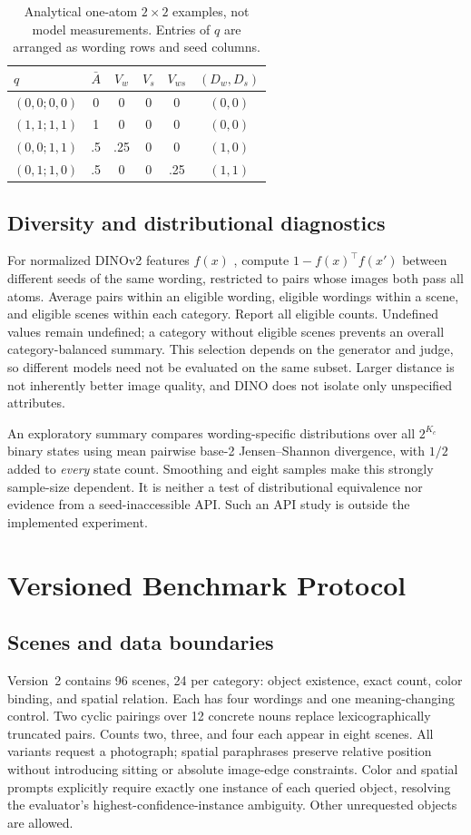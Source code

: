 \documentclass[10pt,letterpaper]{article}
\begin{document}
\begin{table}[t]
\centering\caption{Analytical one-atom $2\times2$ examples, not model measurements. Entries of $q$ are arranged as wording rows and seed columns.}
\begin{tabular}{@{}lccccc@{}}\toprule
$q$ & $\bar A$ & $V_w$ & $V_s$ & $V_{ws}$ & $(D_w,D_s)$\\\midrule
$(0,0;0,0)$ & 0 & 0 & 0 & 0 & $(0,0)$\\
$(1,1;1,1)$ & 1 & 0 & 0 & 0 & $(0,0)$\\
$(0,0;1,1)$ & .5 & .25 & 0 & 0 & $(1,0)$\\
$(0,1;1,0)$ & .5 & 0 & 0 & .25 & $(1,1)$\\\bottomrule
\end{tabular}\label{tab:analytical}
\end{table}

\subsection{Diversity and distributional diagnostics}
For normalized DINOv2 features $f(x)$ \cite{dinov2}, compute $1-f(x)^\top f(x')$ between different seeds of the same wording, restricted to pairs whose images both pass all atoms. Average pairs within an eligible wording, eligible wordings within a scene, and eligible scenes within each category. Report all eligible counts. Undefined values remain undefined; a category without eligible scenes prevents an overall category-balanced summary. This selection depends on the generator and judge, so different models need not be evaluated on the same subset. Larger distance is not inherently better image quality, and DINO does not isolate only unspecified attributes.

An exploratory summary compares wording-specific distributions over all $2^{K_c}$ binary states using mean pairwise base-2 Jensen--Shannon divergence, with $1/2$ added to \emph{every} state count. Smoothing and eight samples make this strongly sample-size dependent. It is neither a test of distributional equivalence nor evidence from a seed-inaccessible API. Such an API study is outside the implemented experiment.

\section{Versioned Benchmark Protocol}
\subsection{Scenes and data boundaries}
Version~2 contains 96 scenes, 24 per category: object existence, exact count, color binding, and spatial relation. Each has four wordings and one meaning-changing control. Two cyclic pairings over 12 concrete nouns replace lexicographically truncated pairs. Counts two, three, and four each appear in eight scenes. All variants request a photograph; spatial paraphrases preserve relative position without introducing sitting or absolute image-edge constraints. Color and spatial prompts explicitly require exactly one instance of each queried object, resolving the evaluator's highest-confidence-instance ambiguity. Other unrequested objects are allowed.
\end{document}
